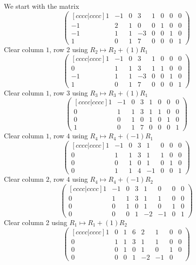 \documentclass{article}
\begin{document}
\begin{Example}
We start with the matrix \[\begin{pmatrix}[ c c c c | c c c c ] 1 &
-1 & 0 & 3 & 1 & 0 & 0 & 0 \\ -1 & 2 & 1 & 0 & 0 & 1 & 0 & 0 \\ -1 &
1 & 1 & -3 & 0 & 0 & 1 & 0 \\ 1 & 0 & 1 & 7 & 0 & 0 & 0 & 1
\end{pmatrix}\] Clear column \(1\), row \(2\) using \(R_2\mapsto
R_2+(1)R_1\)\[\begin{pmatrix}[ c c c c | c c c c ] 1 & -1 & 0 & 3 &
1 & 0 & 0 & 0 \\ 0 & 1 & 1 & 3 & 1 & 1 & 0 & 0 \\ -1 & 1 & 1 & -3 &
0 & 0 & 1 & 0 \\ 1 & 0 & 1 & 7 & 0 & 0 & 0 & 1 \end{pmatrix}\]Clear
column \(1\), row \(3\) using \(R_3\mapsto
R_3+(1)R_1\)\[\begin{pmatrix}[ c c c c | c c c c ] 1 & -1 & 0 & 3 &
1 & 0 & 0 & 0 \\ 0 & 1 & 1 & 3 & 1 & 1 & 0 & 0 \\ 0 & 0 & 1 & 0 & 1
& 0 & 1 & 0 \\ 1 & 0 & 1 & 7 & 0 & 0 & 0 & 1 \end{pmatrix}\]Clear
column \(1\), row \(4\) using \(R_4\mapsto
R_4+(-1)R_1\)\[\begin{pmatrix}[ c c c c | c c c c ] 1 & -1 & 0 & 3 &
1 & 0 & 0 & 0 \\ 0 & 1 & 1 & 3 & 1 & 1 & 0 & 0 \\ 0 & 0 & 1 & 0 & 1
& 0 & 1 & 0 \\ 0 & 1 & 1 & 4 & -1 & 0 & 0 & 1 \end{pmatrix}\]Clear
column \(2\), row \(4\) using \(R_4\mapsto
R_4+(-1)R_2\)\[\begin{pmatrix}[ c c c c | c c c c ] 1 & -1 & 0 & 3 &
1 & 0 & 0 & 0 \\ 0 & 1 & 1 & 3 & 1 & 1 & 0 & 0 \\ 0 & 0 & 1 & 0 & 1
& 0 & 1 & 0 \\ 0 & 0 & 0 & 1 & -2 & -1 & 0 & 1 \end{pmatrix}\]Clear
column 2 using \(R_1\mapsto R_1+(1)R_2\)\[\begin{pmatrix}[ c c c c |
c c c c ] 1 & 0 & 1 & 6 & 2 & 1 & 0 & 0 \\ 0 & 1 & 1 & 3 & 1 & 1 & 0
& 0 \\ 0 & 0 & 1 & 0 & 1 & 0 & 1 & 0 \\ 0 & 0 & 0 & 1 & -2 & -1 & 0

\end{pmatrix}\]
\end{Example}
\end{document}
